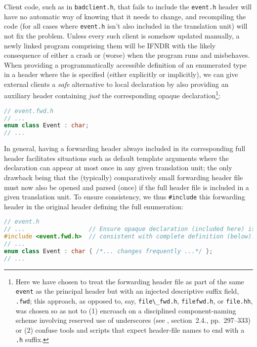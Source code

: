 \noindent Client code, such as in \lstinline!badclient.h!, that fails to include the
\lstinline!event.h! header will have no automatic way of knowing that it
needs to change, and recompiling the code (for all cases where
\lstinline!event.h! isn't also included in the translation unit) will not
fix the problem. Unless every such client is somehow updated manually, a
newly linked program comprising them will be IFNDR with the likely
consequence of either a crash or (worse) when the program runs and
misbehaves. When providing a programmatically accessible definition of
an enumerated type in a header where the  is
specified (either explicitly or implicitly), we can give external
clients a \emph{safe} alternative to local declaration by also providing
an auxiliary header containing \emph{just} the corresponding opaque
declaration{\cprotect\footnote{Here we have chosen to treat the
forwarding header file as part of the same \lstinline!event!
 as the principal header but with an injected
descriptive suffix field, \lstinline!.fwd!; this approach, as opposed to,
say, \lstinline!file\_fwd.h!, \lstinline!filefwd.h!, or \lstinline!file.hh!,
was chosen so as not to (1) encroach on a disciplined component-naming
scheme involving reserved use of underscores (see \cite{lakos20},
section~2.4., pp.~297--333) or (2) confuse tools and scripts that
expect header-file names to end with a \lstinline!.h! suffix.}}:

\begin{lstlisting}[language=C++]
// event.fwd.h
// ...
enum class Event : char;
// ...
\end{lstlisting}

\noindent In general, having a forwarding header always included in its
corresponding full header facilitates situations such as default
template arguments where the declaration can appear at most once in any
given translation unit; the only drawback being that the (typically)
comparatively small forwarding header file must now also be opened and
parsed (once) if the full header file is included in a given translation
unit. To ensure consistency, we thus \lstinline!#include! this forwarding
header in the original header defining the full enumeration:

\begin{lstlisting}[language=C++]
// event.h
// ...                  // Ensure opaque declaration (included here) is
#include <event.fwd.h>  // consistent with complete definition (below).
// ...
enum class Event : char { /*... changes frequently ...*/ };
// ...
\end{lstlisting}

